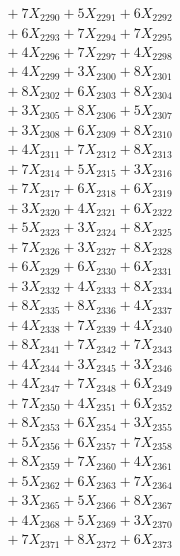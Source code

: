 \documentclass[a4paper,10pt]{article}
\begin{document}
{\begin{align}
&\;  + 7 X_{2290} + 5 X_{2291} + 6 X_{2292} \\[0.3ex]
&\;  + 6 X_{2293} + 7 X_{2294} + 7 X_{2295} \\[0.3ex]
&\;  + 4 X_{2296} + 7 X_{2297} + 4 X_{2298} \\[0.3ex]
&\;  + 4 X_{2299} + 3 X_{2300} + 8 X_{2301} \\[0.3ex]
&\;  + 8 X_{2302} + 6 X_{2303} + 8 X_{2304} \\[0.3ex]
&\;  + 3 X_{2305} + 8 X_{2306} + 5 X_{2307} \\[0.3ex]
&\;  + 3 X_{2308} + 6 X_{2309} + 8 X_{2310} \\[0.3ex]
&\;  + 4 X_{2311} + 7 X_{2312} + 8 X_{2313} \\[0.3ex]
&\;  + 7 X_{2314} + 5 X_{2315} + 3 X_{2316} \\[0.3ex]
&\;  + 7 X_{2317} + 6 X_{2318} + 6 X_{2319} \\[0.5ex]\allowbreak
&\;  + 3 X_{2320} + 4 X_{2321} + 6 X_{2322} \\[0.3ex]
&\;  + 5 X_{2323} + 3 X_{2324} + 8 X_{2325} \\[0.3ex]
&\;  + 7 X_{2326} + 3 X_{2327} + 8 X_{2328} \\[0.3ex]
&\;  + 6 X_{2329} + 6 X_{2330} + 6 X_{2331} \\[0.3ex]
&\;  + 3 X_{2332} + 4 X_{2333} + 8 X_{2334} \\[0.3ex]
&\;  + 8 X_{2335} + 8 X_{2336} + 4 X_{2337} \\[0.3ex]
&\;  + 4 X_{2338} + 7 X_{2339} + 4 X_{2340} \\[0.3ex]
&\;  + 8 X_{2341} + 7 X_{2342} + 7 X_{2343} \\[0.3ex]
&\;  + 4 X_{2344} + 3 X_{2345} + 3 X_{2346} \\[0.3ex]
&\;  + 4 X_{2347} + 7 X_{2348} + 6 X_{2349} \\[0.5ex]\allowbreak
&\;  + 7 X_{2350} + 4 X_{2351} + 6 X_{2352} \\[0.3ex]
&\;  + 8 X_{2353} + 6 X_{2354} + 3 X_{2355} \\[0.3ex]
&\;  + 5 X_{2356} + 6 X_{2357} + 7 X_{2358} \\[0.3ex]
&\;  + 8 X_{2359} + 7 X_{2360} + 4 X_{2361} \\[0.3ex]
&\;  + 5 X_{2362} + 6 X_{2363} + 7 X_{2364} \\[0.3ex]
&\;  + 3 X_{2365} + 5 X_{2366} + 8 X_{2367} \\[0.3ex]
&\;  + 4 X_{2368} + 5 X_{2369} + 3 X_{2370} \\[0.3ex]
&\;  + 7 X_{2371} + 8 X_{2372} + 6 X_{2373} \\[0.3ex]

\end{align}}
\end{document}
